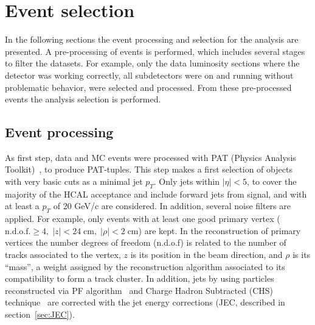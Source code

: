 

\section{Event selection}
\label{sec:sel}

In the following sections the event processing and selection for the analysis are presented. A pre-processing of events is performed, which includes several stages to filter the datasets. For example, only the data luminosity sections where the detector was working correctly, all subdetectors were on and running without problematic behavior, were selected and processed. From these pre-processed events the analysis selection is performed.

\subsection{Event processing}

As first step, data and MC events were processed with PAT (Physics Analysis Toolkit)~\cite{Adam:2010zza}, to produce PAT-tuples. This step makes a first selection of objects with very basic cuts as a minimal jet $p_{T}$. Only jets within $|\eta|<5$, to cover the majority of the HCAL acceptance and include forward jets from signal, and with at least a $p_{T}$ of 20 GeV/c are considered. In addition, several noise filters are applied. For example, only events with at least one good primary vertex ($\text{n.d.o.f.} \ge 4,\; |z|<24 \;\text{cm},\; |\rho|< 2 \;\text{cm}$) are kept. In the reconstruction of primary vertices the number degrees of freedom (n.d.o.f) is related to the number of tracks associated to the vertex, $z$ is its position in the beam direction, and $\rho$ is its ``mass'', a weight assigned by the reconstruction algorithm associated to its compatibility to form a track cluster. In addition, jets by using particles reconstructed via PF algorithm~\cite{CMS:2009nxa,CMS:2010eua,CMS:2010byl,CMS:2010aua} and Charge Hadron Subtracted (CHS) technique~\cite{Kirschenmann:1627818} are corrected with the jet energy corrections (JEC, described in section~\ref{sec:JEC}). %

